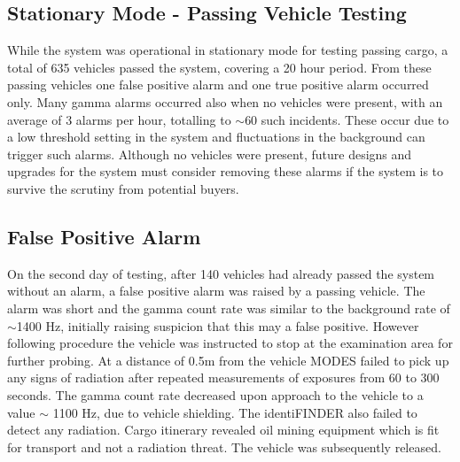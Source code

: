 \subsection{Stationary Mode - Passing Vehicle Testing}
While the system was operational in stationary mode for testing passing cargo, a total of 635 vehicles passed the system, covering a 20 hour period. From these passing vehicles one false positive alarm and one true positive alarm occurred only. Many gamma alarms occurred also when no vehicles were present, with an average of 3 alarms per hour, totalling to $\sim$60 such incidents. These occur due to a low threshold setting in the system and fluctuations in the background can trigger such alarms. Although no vehicles were present, future designs and upgrades for the system must consider removing these alarms if the system is to survive the scrutiny from potential buyers.

\subsection{False Positive Alarm}
On the second day of testing, after 140 vehicles had already passed the system without an alarm, a false positive alarm was raised by a passing vehicle. The alarm was short and the gamma count rate was similar to the background rate of $\sim$1400 Hz, initially raising suspicion that this may a false positive. However following procedure the vehicle was instructed to stop at the examination area for further probing. At a distance of 0.5m from the vehicle MODES failed to pick up any signs of radiation after repeated measurements of exposures from 60 to 300 seconds. The gamma count rate decreased upon approach to the vehicle to a value $\sim$ 1100 Hz, due to vehicle shielding. The identiFINDER also failed to detect any radiation. Cargo itinerary revealed oil mining equipment which is fit for transport and not a radiation threat. The vehicle was subsequently released. 

